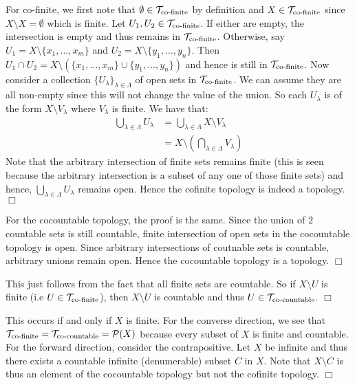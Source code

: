 \documentclass{article}
\begin{document}
 {
    \begin{spacedenumerate}
        \item For co-finite, we first note that $\emptyset\in \mathcal{T}_{\text{co-finite}}$ by definition and $X\in \mathcal{T}_{\text{co-finite}}$ since $X\setminus X = \emptyset$ which is finite. Let $U_{1},U_{2}\in\mathcal{T}_{\text{co-finite}}$. If either are empty, the intersection is empty and thus remains in $\mathcal{T}_{\text{co-finite}}$. Otherwise, say $U_{1} = X\setminus\{x_{1},\dots, x_{m}\}$ and $U_{2} = X\setminus \{y_{1},\dots, y_{n}\}$. Then $U_{1}\cap U_{2} = X\setminus (\{x_{1},\dots, x_{m}\}\cup \{y_{1},\dots, y_{n}\})$ and hence is still in $\mathcal{T}_{\text{co-finite}}$. Now consider a collection $\{U_{\lambda}\}_{\lambda\in \Lambda}$ of open sets in $\mathcal{T}_{\text{co-finite}}$. We can assume they are all non-empty since this will not change the value of the union. So each $U_{\lambda}$ is of the form $X\setminus V_{\lambda}$ where $V_{\lambda}$ is finite. We have that:
        \begin{align*}
            \bigcup_{\lambda\in\Lambda}U_{\lambda} &= \bigcup_{\lambda\in\Lambda}X\setminus V_{\lambda}\\
            &= X\setminus\left(\bigcap_{\lambda\in \Lambda} V_{\lambda}\right)
        \end{align*}
        Note that the arbitrary intersection of finite sets remains finite (this is seen because the arbitrary intersection is a subset of any one of those finite sets) and hence, $\bigcup_{\lambda\in\Lambda}U_{\lambda}$ remains open. Hence the cofinite topology is indeed a topology. $\Box$

        For the cocountable topology, the proof is the same. Since the union of 2 countable sets is still countable, finite intersection of open sets in the cocountable topology is open. Since arbitrary intersections of coutnable sets is countable, arbitrary unions remain open. Hence the cocountable topology is a topology. $\Box$
        \item This just follows from the fact that all finite sets are countable. So if $X\setminus U$ is finite (i.e $U\in \mathcal{T}_{\text{co-finite}}$), then $X\setminus U$ is countable and thus $U\in \mathcal{T}_{\text{co-countable}}$. $\Box$
        \item This occurs if and only if $X$ is finite. For the converse direction, we see that $\mathcal{T}_{\text{co-finite}} = \mathcal{T}_{\text{co-countable}} = \mathcal{P}(X)$ because every subset of $X$ is finite and countable. For the forward direction, consider the contrapositive. Let $X$ be infinite and thus there exists a countable infinite (denumerable) subset $C$ in $X$. Note that $X\setminus C$ is thus an element of the cocountable topology but not the cofinite topology. $\Box$


\end{spacedenumerate}}
\end{document}
